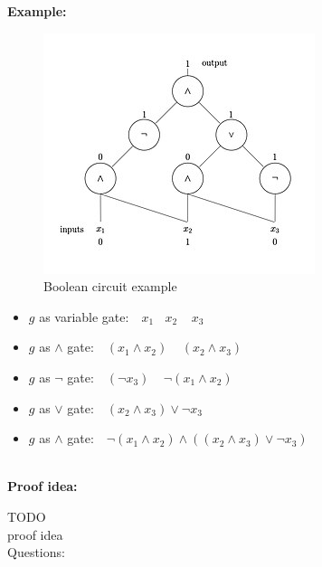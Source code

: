 \documentclass[a4]{scrartcl}
\begin{document}
\textbf{Example:} \\
\begin{minipage}{0.4\textwidth}

\begin{figure}[H]
\begin{center}
\includegraphics[scale=0.6]{booleanC.jpg}
\end{center}
\caption{Boolean circuit example \cite{booleanC}}
\end{figure}

\end{minipage}\begin{minipage}{0.6\textwidth}

\begin{itemize}
\item $g$ as variable gate: $\ \ \ x_1 \ \ \ \  x_2 \ \ \ \ \ x_3$
\item $g$ as $\wedge$ gate: $\ \ \ (x_1 \wedge x_2) \ \ \ \ \ (x_2 \wedge x_3)$
\item $g$ as $\lnot$ gate: $\ \ \ (\lnot x_3) \ \ \ \ \ \lnot (x_1 \wedge x_2)$
\item $g$ as $\vee$ gate: $\ \ \ (x_2 \wedge x_3) \vee \lnot x_3$
\item $g$ as $\wedge$ gate: $\ \ \ \lnot(x_1 \wedge x_2) \wedge ((x_2 \wedge x_3) \vee \lnot x_3)$
\end{itemize}

\end{minipage}

\ \\
\textbf{Proof idea:}






\color{red} TODO \\
proof idea \\
\color{black}
\color{violet} Questions:
\color{black}
\end{document}
